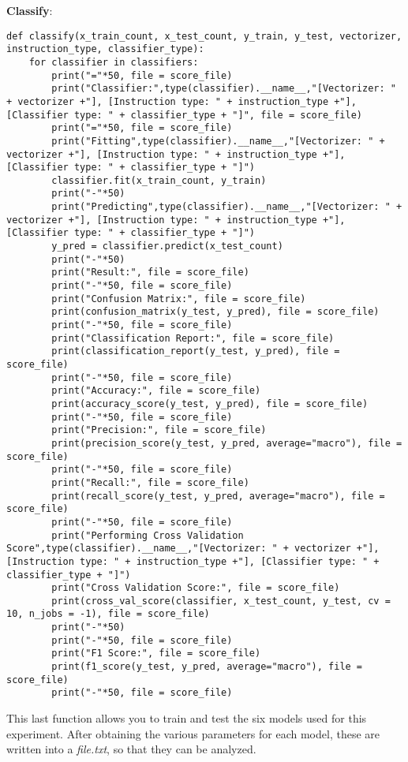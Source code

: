 \documentclass[11pt]{article}
\begin{document}
\textbf{Classify}:
\begin{lstlisting}
def classify(x_train_count, x_test_count, y_train, y_test, vectorizer, instruction_type, classifier_type):
	for classifier in classifiers:
		print("="*50, file = score_file)
		print("Classifier:",type(classifier).__name__,"[Vectorizer: " + vectorizer +"], [Instruction type: " + instruction_type +"], [Classifier type: " + classifier_type + "]", file = score_file)
		print("="*50, file = score_file)
		print("Fitting",type(classifier).__name__,"[Vectorizer: " + vectorizer +"], [Instruction type: " + instruction_type +"], [Classifier type: " + classifier_type + "]")
		classifier.fit(x_train_count, y_train)
		print("-"*50)
		print("Predicting",type(classifier).__name__,"[Vectorizer: " + vectorizer +"], [Instruction type: " + instruction_type +"], [Classifier type: " + classifier_type + "]")
		y_pred = classifier.predict(x_test_count)
		print("-"*50)
		print("Result:", file = score_file)
		print("-"*50, file = score_file)
		print("Confusion Matrix:", file = score_file)
		print(confusion_matrix(y_test, y_pred), file = score_file)
		print("-"*50, file = score_file)
		print("Classification Report:", file = score_file)
		print(classification_report(y_test, y_pred), file = score_file)
		print("-"*50, file = score_file)
		print("Accuracy:", file = score_file)
		print(accuracy_score(y_test, y_pred), file = score_file)
		print("-"*50, file = score_file)
		print("Precision:", file = score_file)
		print(precision_score(y_test, y_pred, average="macro"), file = score_file)
		print("-"*50, file = score_file)
		print("Recall:", file = score_file)
		print(recall_score(y_test, y_pred, average="macro"), file = score_file)
		print("-"*50, file = score_file)
		print("Performing Cross Validation Score",type(classifier).__name__,"[Vectorizer: " + vectorizer +"], [Instruction type: " + instruction_type +"], [Classifier type: " + classifier_type + "]")
		print("Cross Validation Score:", file = score_file)
		print(cross_val_score(classifier, x_test_count, y_test, cv = 10, n_jobs = -1), file = score_file)
		print("-"*50)
		print("-"*50, file = score_file)
		print("F1 Score:", file = score_file)
		print(f1_score(y_test, y_pred, average="macro"), file = score_file)
		print("-"*50, file = score_file)
\end{lstlisting}
This last function allows you to train and test the six models used for this experiment. After obtaining the various parameters for each model, these are written into a \textit{file.txt}, so that they can be analyzed.
\end{document}
